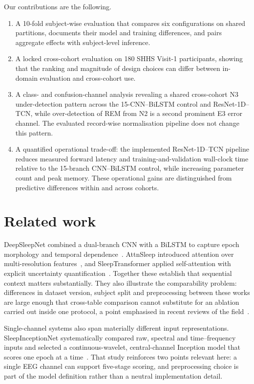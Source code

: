 \documentclass[11pt,a4paper]{article}
\begin{document}
Our contributions are the following.

\begin{enumerate}[label=(\arabic*)]
\item A 10-fold subject-wise evaluation that compares six configurations on shared partitions,
documents their model and training differences, and pairs aggregate effects with subject-level inference.
\item A locked cross-cohort evaluation on 180 SHHS Visit-1 participants, showing that the ranking and
magnitude of design choices can differ between in-domain evaluation and cross-cohort use.
\item A class- and confusion-channel analysis revealing a shared cross-cohort N3 under-detection pattern
across the 15-CNN--BiLSTM control and ResNet-1D--TCN, while over-detection of REM from N2 is a second
prominent E3 error channel. The evaluated record-wise normalisation pipeline does not change this pattern.
\item A quantified operational trade-off: the implemented ResNet-1D--TCN pipeline reduces measured
forward latency and training-and-validation wall-clock time relative to the 15-branch CNN--BiLSTM
control, while increasing parameter count and peak memory. These operational gains are distinguished
from predictive differences within and across cohorts.
\end{enumerate}

\section{Related work}

DeepSleepNet combined a dual-branch CNN with a BiLSTM to capture epoch morphology and temporal
dependence~\cite{supratak2017deepsleepnet}. AttnSleep introduced attention over multi-resolution
features~\cite{eldele2021attnsleep}, and SleepTransformer applied self-attention with explicit
uncertainty quantification~\cite{phan2022sleeptransformer}. Together these establish that sequential
context matters substantially. They also illustrate the comparability problem: differences in dataset
version, subject split and preprocessing between these works are large enough that cross-table
comparison cannot substitute for an ablation carried out inside one protocol, a point emphasised in
recent reviews of the field~\cite{phan2022review}.

Single-channel systems also span materially different input representations. SleepInceptionNet
systematically compared raw, spectral and time--frequency inputs and selected a continuous-wavelet,
central-channel Inception model that scores one epoch at a time~\cite{haghayegh2023sleepinceptionnet}.
That study reinforces two points relevant here: a single EEG channel can support five-stage scoring, and
preprocessing choice is part of the model definition rather than a neutral implementation detail.
\end{document}

